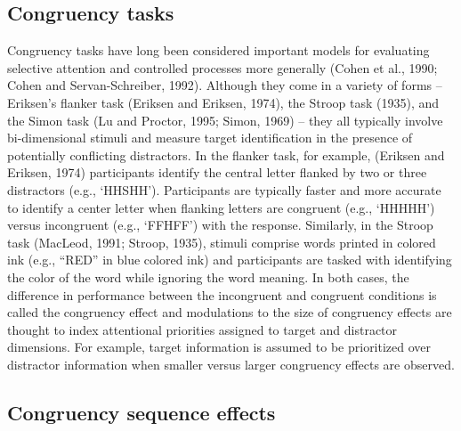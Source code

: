 \documentclass[]{DissertateCUNY}
\begin{document}
\hypertarget{congruency-tasks}{%
\subsection{Congruency tasks}\label{congruency-tasks}}

Congruency tasks have long been considered important models for
evaluating selective attention and controlled processes more generally
(Cohen et al., 1990; Cohen and Servan-Schreiber, 1992). Although they
come in a variety of forms -- Eriksen's flanker task (Eriksen and
Eriksen, 1974), the Stroop task (1935), and the Simon task (Lu and
Proctor, 1995; Simon, 1969) -- they all typically involve bi-dimensional
stimuli and measure target identification in the presence of potentially
conflicting distractors. In the flanker task, for example, (Eriksen and
Eriksen, 1974) participants identify the central letter flanked by two
or three distractors (e.g., `HHSHH'). Participants are typically faster
and more accurate to identify a center letter when flanking letters are
congruent (e.g., `HHHHH') versus incongruent (e.g., `FFHFF') with the
response. Similarly, in the Stroop task (MacLeod, 1991; Stroop, 1935),
stimuli comprise words printed in colored ink (e.g., ``RED'' in blue
colored ink) and participants are tasked with identifying the color of
the word while ignoring the word meaning. In both cases, the difference
in performance between the incongruent and congruent conditions is
called the congruency effect and modulations to the size of congruency
effects are thought to index attentional priorities assigned to target
and distractor dimensions. For example, target information is assumed to
be prioritized over distractor information when smaller versus larger
congruency effects are observed.

\hypertarget{congruency-sequence-effects}{%
\subsection{Congruency sequence
effects}\label{congruency-sequence-effects}}
\end{document}
